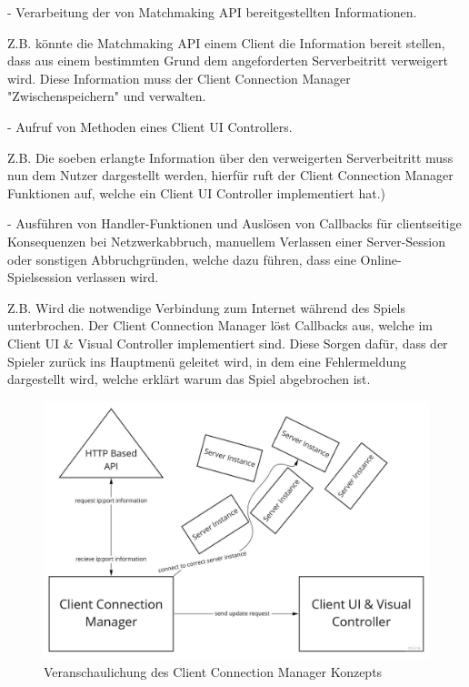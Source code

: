 - Verarbeitung der von Matchmaking API bereitgestellten Informationen. 

Z.B. könnte die Matchmaking API einem Client die Information bereit stellen, dass aus einem bestimmten Grund dem angeforderten Serverbeitritt verweigert wird. Diese Information muss der Client Connection Manager "Zwischenspeichern" und verwalten.

- Aufruf von Methoden eines Client UI Controllers.

Z.B. Die soeben erlangte Information über den verweigerten Serverbeitritt muss nun dem Nutzer dargestellt werden, hierfür ruft der Client Connection Manager Funktionen auf, welche ein Client UI Controller implementiert hat.)

- Ausführen von Handler-Funktionen und Auslösen von Callbacks für clientseitige Konsequenzen bei Netzwerkabbruch, manuellem Verlassen einer Server-Session oder sonstigen Abbruchgründen, welche dazu führen, dass eine Online-Spielsession verlassen wird.

Z.B. Wird die notwendige Verbindung zum Internet während des Spiels unterbrochen. Der Client Connection Manager löst Callbacks aus, welche im Client UI \& Visual Controller implementiert sind. Diese Sorgen dafür, dass der Spieler zurück ins Hauptmenü geleitet wird, in dem eine Fehlermeldung dargestellt wird, welche erklärt warum das Spiel abgebrochen ist.

\begin{figure}
	\centering
	\includegraphics[width=150mm]{images/Client_Connection_Manager.jpg}
	\caption[Client Connection Manager Diagramm]{Veranschaulichung des Client Connection Manager Konzepts}
	\label{pic:Client_Connection_Manager}
\end{figure}



